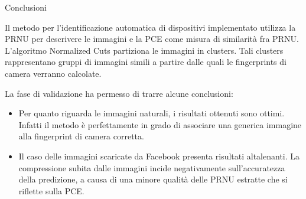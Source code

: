 \begin{tframe}{Conclusioni}

Il metodo per l'identificazione automatica di dispositivi implementato utilizza la PRNU per descrivere le immagini e la PCE come misura di similarità fra PRNU. L'algoritmo Normalized Cuts partiziona le immagini in clusters. Tali clusters rappresentano gruppi di immagini simili a partire dalle quali le fingerprints di camera verranno calcolate.

\vspace{0.1in}

La fase di validazione ha permesso di trarre alcune conclusioni:
\begin{itemize}
\item Per quanto riguarda le immagini naturali, i risultati ottenuti sono ottimi. Infatti il metodo è perfettamente in grado di associare una generica immagine alla fingerprint di camera corretta.
\item Il caso delle immagini scaricate da Facebook presenta risultati altalenanti. La compressione subita dalle immagini incide negativamente sull'accuratezza della predizione, a causa di una minore qualità delle PRNU estratte che si riflette sulla PCE.
\end{itemize}

\end{tframe}